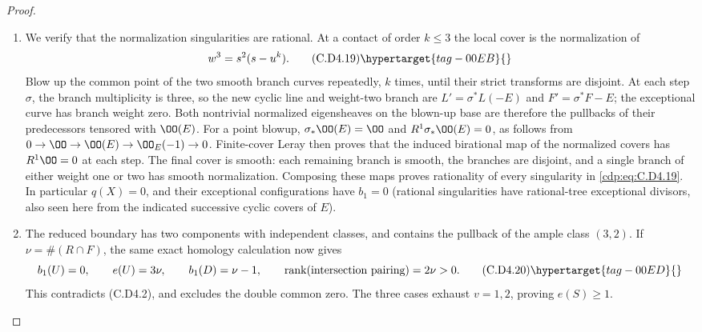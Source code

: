 \begin{proof}
\begin{enumerate}[label={$\langle1\rangle$\arabic*.},leftmargin=*]
\paragraph{A double common zero.}
Finally the cubic divisor is $R_{(3,1)}+2F$. The normalized
cyclic cover has the exact eigensheaf algebra
\[
 \pi_*\OO_{X_0}
       =\OO_E\oplus L^{-1}\oplus L^{-2}(F),
       \qquad L=\OO_E(1,1).
\tag{C.D4.18}\hypertarget{tag-00EA}{}\label{cdp:eq:C.D4.18}
\]
One obtains the last summand by dividing the square of the
cyclic coordinate by a local equation of the weight-two
branch; this integral element satisfies its monic cubic
relation. These summands describe the normalization in
codimension one and hence everywhere by normality. Their
$H^1$ groups vanish, since their bidegrees are $(0,0)$,
$(-1,-1)$ and $(-2,-1)$.

\item We verify that the normalization singularities are rational.
At a contact of order $k\le3$ the local cover is the
normalization of
\[
                            w^3=s^2(s-u^k).
\tag{C.D4.19}\hypertarget{tag-00EB}{}\label{cdp:eq:C.D4.19}
\]
Blow up the common point of the two smooth branch curves
repeatedly, $k$ times, until their strict transforms are
disjoint. At each step $\sigma$, the branch multiplicity
is three, so the new cyclic line and weight-two branch
are $L'=\sigma^*L(-E)$ and $F'=\sigma^*F-E$; the exceptional
curve has branch weight zero. Both nontrivial normalized
eigensheaves on the blown-up base are therefore the
pullbacks of their predecessors tensored with $\OO(E)$.
For a point blowup,
$\sigma_*\OO(E)=\OO$ and $R^1\sigma_*\OO(E)=0$, as follows
from $0\to\OO\to\OO(E)\to\OO_E(-1)\to0$.
Finite-cover Leray then proves that the induced birational
map of the normalized covers has $R^1\OO=0$ at each step.
The final cover is smooth: each remaining branch is smooth,
the branches are disjoint, and a single branch of either
weight one or two has smooth normalization. Composing
these maps proves rationality of every singularity in
\eqref{cdp:eq:C.D4.19}. In particular $q(X)=0$, and their exceptional
configurations have $b_1=0$ (rational singularities have
rational-tree exceptional divisors, also seen here from
the indicated successive cyclic covers of $E$).

\item The reduced boundary has two components with independent
classes, and contains the pullback of the ample class
$(3,2)$. If $\nu=\#(R\cap F)$, the same exact homology
calculation now gives
\[
        b_1(U)=0,\qquad e(U)=3\nu,\qquad
        b_1(D)=\nu-1,\qquad
        \operatorname{rank}(\hbox{intersection pairing})=2\nu>0.
\tag{C.D4.20}\hypertarget{tag-00ED}{}\label{cdp:eq:C.D4.20}
\]
This contradicts (C.D4.2), and excludes the double common
zero. The three cases exhaust $v=1,2$, proving $e(S)\ge1$.

\end{enumerate}
\end{proof}
